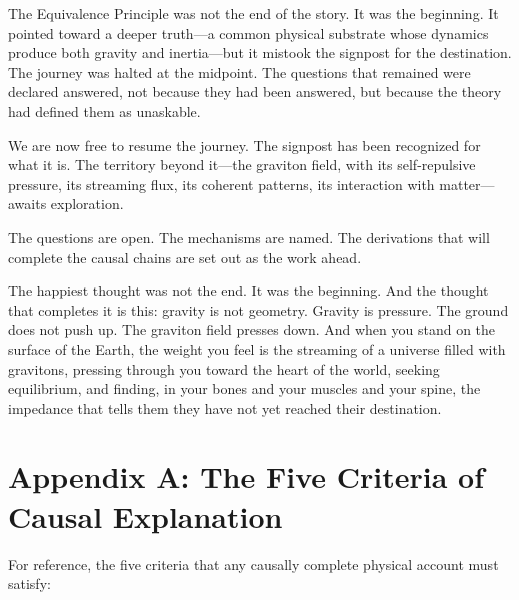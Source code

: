 \documentclass[11pt]{article}
\begin{document}
The Equivalence Principle was not the end of the story. It was the beginning. It pointed toward a deeper truth---a common physical substrate whose dynamics produce both gravity and inertia---but it mistook the signpost for the destination. The journey was halted at the midpoint. The questions that remained were declared answered, not because they had been answered, but because the theory had defined them as unaskable.

We are now free to resume the journey. The signpost has been recognized for what it is. The territory beyond it---the graviton field, with its self-repulsive pressure, its streaming flux, its coherent patterns, its interaction with matter---awaits exploration.

The questions are open. The mechanisms are named. The derivations that will complete the causal chains are set out as the work ahead.

The happiest thought was not the end. It was the beginning. And the thought that completes it is this: gravity is not geometry. Gravity is pressure. The ground does not push up. The graviton field presses down. And when you stand on the surface of the Earth, the weight you feel is the streaming of a universe filled with gravitons, pressing through you toward the heart of the world, seeking equilibrium, and finding, in your bones and your muscles and your spine, the impedance that tells them they have not yet reached their destination.

\section{Appendix A: The Five Criteria of Causal Explanation}

For reference, the five criteria that any causally complete physical account must satisfy:
\end{document}
